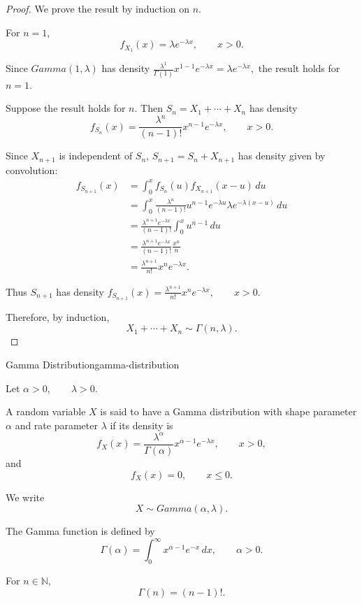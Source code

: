 \begin{proof}

We prove the result by induction on $n$.

For $n=1$,
\[
f_{X_1}(x)
=
\lambda e^{-\lambda x},
\qquad x>0.
\]

Since
\(
Gamma(1,\lambda)
\)
has density
\(
\frac{\lambda^1}{\Gamma(1)}
x^{1-1}e^{-\lambda x}
=
\lambda e^{-\lambda x},
\)
the result holds for $n=1$.

\medskip

Suppose the result holds for $n$. Then
\(
S_n=X_1+\cdots+X_n
\)
has density
\[
f_{S_n}(x)
=
\frac{\lambda^n}{(n-1)!}
x^{n-1}e^{-\lambda x},
\qquad x>0.
\]

Since $X_{n+1}$ is independent of $S_n$,
\(
S_{n+1}=S_n+X_{n+1}
\)
has density given by convolution:
\[
\begin{aligned}
f_{S_{n+1}}(x)
&=
\int_0^x
f_{S_n}(u)
f_{X_{n+1}}(x-u)\,du\\
&=
\int_0^x
\frac{\lambda^n}{(n-1)!}
u^{n-1}e^{-\lambda u}
\lambda e^{-\lambda(x-u)}
\,du\\
&=
\frac{\lambda^{n+1}e^{-\lambda x}}
{(n-1)!}
\int_0^x u^{n-1}\,du\\
&=
\frac{\lambda^{n+1}e^{-\lambda x}}
{(n-1)!}
\frac{x^n}{n}\\
&=
\frac{\lambda^{n+1}}
{n!}
x^ne^{-\lambda x}.
\end{aligned}
\]

Thus
\(
S_{n+1}
\)
has density
\(
f_{S_{n+1}}(x)
=
\frac{\lambda^{n+1}}{n!}
x^ne^{-\lambda x},
\qquad x>0.
\)

Therefore, by induction,
\[
\boxed{
X_1+\cdots+X_n
\sim
\Gamma(n,\lambda).
}
\]

\end{proof}



\begin{definition}{Gamma Distribution}{gamma-distribution}

Let
\(
\alpha>0,
\qquad
\lambda>0.
\)


A random variable $X$ is said to have a Gamma distribution with
shape parameter $\alpha$ and rate parameter $\lambda$ if its
density is
\[
f_X(x)
=
\frac{\lambda^\alpha}{\Gamma(\alpha)}
x^{\alpha-1}e^{-\lambda x},
\qquad x>0,
\]
and
\[
f_X(x)=0,
\qquad x\leq0.
\]

We write
\[
X\sim Gamma(\alpha,\lambda).
\]

The Gamma function is defined by
\[
\Gamma(\alpha)
=
\int_0^\infty
x^{\alpha-1}e^{-x}\,dx,
\qquad
\alpha>0.
\]

For $n\in\mathbb{N}$,
\[
\Gamma(n)=(n-1)!.
\]

\end{definition}


